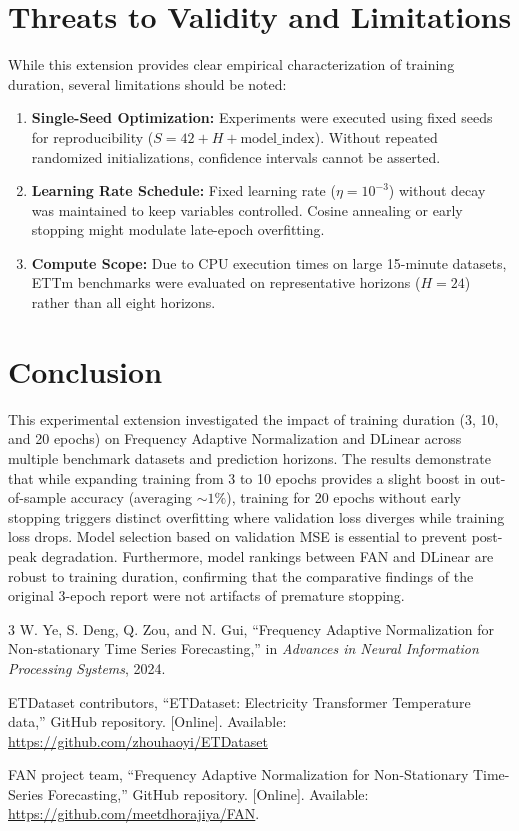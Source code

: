 \documentclass[conference,10pt]{IEEEtran}
\begin{document}
\section{Threats to Validity and Limitations}
While this extension provides clear empirical characterization of training duration, several limitations should be noted:
\begin{enumerate}
    \item \textbf{Single-Seed Optimization:} Experiments were executed using fixed seeds for reproducibility ($S=42 + H + \text{model\_index}$). Without repeated randomized initializations, confidence intervals cannot be asserted.
    \item \textbf{Learning Rate Schedule:} Fixed learning rate ($\eta=10^{-3}$) without decay was maintained to keep variables controlled. Cosine annealing or early stopping might modulate late-epoch overfitting.
    \item \textbf{Compute Scope:} Due to CPU execution times on large 15-minute datasets, ETTm benchmarks were evaluated on representative horizons ($H=24$) rather than all eight horizons.
\end{enumerate}

\section{Conclusion}
This experimental extension investigated the impact of training duration (3, 10, and 20 epochs) on Frequency Adaptive Normalization and DLinear across multiple benchmark datasets and prediction horizons. The results demonstrate that while expanding training from 3 to 10 epochs provides a slight boost in out-of-sample accuracy (averaging $\sim 1\%$), training for 20 epochs without early stopping triggers distinct overfitting where validation loss diverges while training loss drops. Model selection based on validation MSE is essential to prevent post-peak degradation. Furthermore, model rankings between FAN and DLinear are robust to training duration, confirming that the comparative findings of the original 3-epoch report were not artifacts of premature stopping.

\balance
\begin{thebibliography}{3}
W. Ye, S. Deng, Q. Zou, and N. Gui,
``Frequency Adaptive Normalization for Non-stationary Time Series Forecasting,''
in \emph{Advances in Neural Information Processing Systems}, 2024.

ETDataset contributors, ``ETDataset: Electricity Transformer Temperature data,'' GitHub repository. [Online]. Available: \url{https://github.com/zhouhaoyi/ETDataset}

FAN project team, ``Frequency Adaptive Normalization for Non-Stationary Time-Series Forecasting,'' GitHub repository. [Online]. Available: \url{https://github.com/meetdhorajiya/FAN}.

\end{thebibliography}
\end{document}
